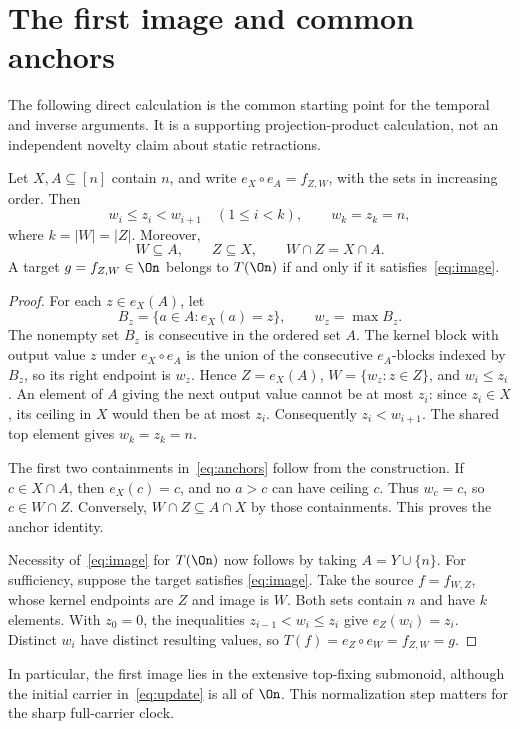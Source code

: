 \section{The first image and common anchors}\label{sec:image}

The following direct calculation is the common starting point for the
temporal and inverse arguments. It is a supporting projection-product
calculation, not an independent novelty claim about static retractions.

\begin{lemma}\label{lem:product}
Let $X,A\subseteq[n]$ contain $n$, and write
$e_X\circ e_A=f_{Z,W}$, with the sets in increasing order. Then
\begin{equation}\label{eq:image}
 w_i\le z_i<w_{i+1}\quad(1\le i<k),\qquad w_k=z_k=n,
\end{equation}
where $k=|W|=|Z|$. Moreover,
\begin{equation}\label{eq:anchors}
 W\subseteq A,\qquad Z\subseteq X,\qquad W\cap Z=X\cap A.
\end{equation}
A target $g=f_{Z,W}\in\On$ belongs to $T(\On)$ if and only if it
satisfies~\eqref{eq:image}.
\end{lemma}

\begin{proof}
For each $z\in e_X(A)$, let
\[
 B_z=\{a\in A:e_X(a)=z\},\qquad w_z=\max B_z.
\]
The nonempty set $B_z$ is consecutive in the ordered set $A$. The kernel
block with output value $z$ under $e_X\circ e_A$ is the union of the
consecutive $e_A$-blocks indexed by $B_z$, so its right endpoint is
$w_z$. Hence $Z=e_X(A)$, $W=\{w_z:z\in Z\}$, and $w_i\le z_i$.
An element of $A$ giving the next output value cannot be at most $z_i$:
since $z_i\in X$, its ceiling in $X$ would then be at most $z_i$.
Consequently $z_i<w_{i+1}$. The shared top element gives $w_k=z_k=n$.

The first two containments in~\eqref{eq:anchors} follow from the
construction. If $c\in X\cap A$, then $e_X(c)=c$, and no $a>c$
can have ceiling $c$. Thus $w_c=c$, so $c\in W\cap Z$. Conversely,
$W\cap Z\subseteq A\cap X$ by those containments. This proves the
anchor identity.

Necessity of~\eqref{eq:image} for $T(\On)$ now follows by taking
$A=Y\cup\{n\}$. For sufficiency, suppose the target satisfies
\eqref{eq:image}. Take the source $f=f_{W,Z}$, whose kernel endpoints
are $Z$ and image is $W$. Both sets contain $n$ and have $k$ elements.
With $z_0=0$, the inequalities $z_{i-1}<w_i\le z_i$ give
$e_Z(w_i)=z_i$. Distinct $w_i$ have distinct resulting values, so
$T(f)=e_Z\circ e_W=f_{Z,W}=g$.
\end{proof}

In particular, the first image lies in the extensive top-fixing
submonoid, although the initial carrier in~\eqref{eq:update} is all of
$\On$. This normalization step matters for the sharp full-carrier clock.
